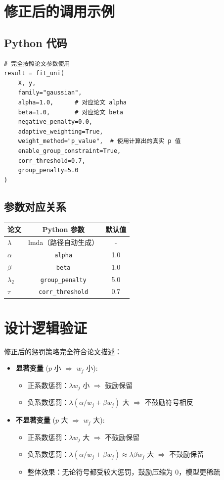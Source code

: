\documentclass[12pt,a4paper]{article}
\begin{document}
\section{修正后的调用示例}

\subsection{Python 代码}

\begin{verbatim}
# 完全按照论文参数使用
result = fit_uni(
    X, y,
    family="gaussian",
    alpha=1.0,      # 对应论文 alpha
    beta=1.0,       # 对应论文 beta
    negative_penalty=0.0,
    adaptive_weighting=True,
    weight_method="p_value",  # 使用计算出的真实 p 值
    enable_group_constraint=True,
    corr_threshold=0.7,
    group_penalty=5.0
)
\end{verbatim}

\subsection{参数对应关系}

\begin{center}
\begin{tabular}{lcc}
\hline
论文 & Python 参数 & 默认值 \\
\hline
$\lambda$ & lmda（路径自动生成） & - \\
$\alpha$ & \texttt{alpha} & 1.0 \\
$\beta$ & \texttt{beta} & 1.0 \\
$\lambda_2$ & \texttt{group\_penalty} & 5.0 \\
$\tau$ & \texttt{corr\_threshold} & 0.7 \\
\hline
\end{tabular}
\end{center}

\section{设计逻辑验证}

修正后的惩罚策略完全符合论文描述：

\begin{itemize}
\item \textbf{显著变量} ($p$ 小 $\Rightarrow$ $w_j$ 小):
  \begin{itemize}
  \item 正系数惩罚：$\lambda w_j$ 小 $\Rightarrow$ 鼓励保留
  \item 负系数惩罚：$\lambda (\alpha / w_j + \beta w_j)$ 大 $\Rightarrow$ 不鼓励符号相反
  \end{itemize}
\item \textbf{不显著变量} ($p$ 大 $\Rightarrow$ $w_j$ 大):
  \begin{itemize}
  \item 正系数惩罚：$\lambda w_j$ 大 $\Rightarrow$ 不鼓励保留
  \item 负系数惩罚：$\lambda (\alpha / w_j + \beta w_j) \approx \lambda \beta w_j$ 大 $\Rightarrow$ 不鼓励保留
  \item 整体效果：无论符号都受较大惩罚，鼓励压缩为 0，模型更稀疏
  \end{itemize}
\end{itemize}
\end{document}
